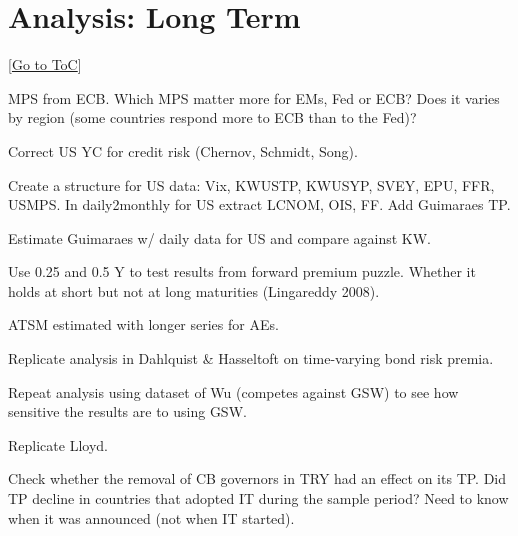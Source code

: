 \documentclass[12pt]{article}
\newcommand{\gototoc}{\vspace{-1.8cm} \null\hfill [\hyperlink{toc}{Go to ToC}] \newline}
\begin{document}
\section{Analysis: Long Term}
\gototoc
\begin{todolist}
	\item MPS from ECB. Which MPS matter more for EMs, Fed or ECB? Does it varies by region (some countries respond more to ECB than to the Fed)?
	\item Correct US YC for credit risk (Chernov, Schmidt, Song).
	\item Create a structure for US data: Vix, KWUSTP, KWUSYP, SVEY, EPU, FFR, USMPS. In daily2monthly for US extract LCNOM, OIS, FF. Add Guimaraes TP.
	\item Estimate Guimaraes w/ daily data for US and compare against KW.
	\item Use 0.25 and 0.5 Y to test results from forward premium puzzle. Whether it holds at short but not at long maturities (Lingareddy 2008).
	\item ATSM estimated with longer series for AEs.
	\item Replicate analysis in Dahlquist \& Hasseltoft on time-varying bond risk premia.
	\item Repeat analysis using dataset of Wu (competes against GSW) to see how sensitive the results are to using GSW.
	\item Replicate Lloyd.
	\item Check whether the removal of CB governors in TRY had an effect on its TP. Did TP decline in countries that adopted IT during the sample period? Need to know when it was announced (not when IT started).
\end{todolist}
\end{document}
